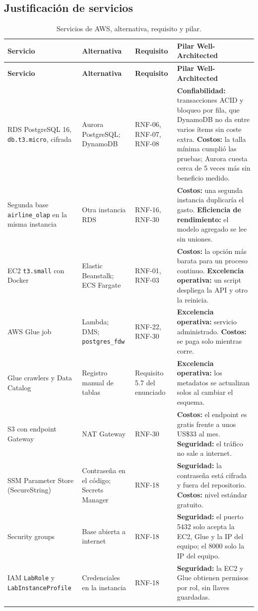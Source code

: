 \subsection{Justificación de servicios}
\begin{longtable}{@{}L{3.0cm} L{2.6cm} L{2.6cm} L{7.4cm}@{}}
\toprule \textbf{Servicio} & \textbf{Alternativa} & \textbf{Requisito} & \textbf{Pilar Well-Architected} \\ \midrule \endfirsthead
\toprule \textbf{Servicio} & \textbf{Alternativa} & \textbf{Requisito} & \textbf{Pilar Well-Architected} \\ \midrule \endhead
RDS PostgreSQL 16, \texttt{db.t3.micro}, cifrada & Aurora PostgreSQL; DynamoDB & RNF-06, RNF-07, RNF-08 & \textbf{Confiabilidad:} transacciones ACID y bloqueo por fila, que DynamoDB no da entre varios ítems sin coste extra. \textbf{Costos:} la talla mínima cumplió las pruebas; Aurora cuesta cerca de 5 veces más sin beneficio medido. \\
Segunda base \texttt{airline\_olap} en la misma instancia & Otra instancia RDS & RNF-16, RNF-30 & \textbf{Costos:} una segunda instancia duplicaría el gasto. \textbf{Eficiencia de rendimiento:} el modelo agregado se lee sin uniones. \\
EC2 \texttt{t3.small} con Docker & Elastic Beanstalk; ECS Fargate & RNF-01, RNF-03 & \textbf{Costos:} la opción más barata para un proceso continuo. \textbf{Excelencia operativa:} un script despliega la API y otro la reinicia. \\
AWS Glue job & Lambda; DMS; \texttt{postgres\_fdw} & RNF-22, RNF-30 & \textbf{Excelencia operativa:} servicio administrado. \textbf{Costos:} se paga solo mientras corre. \\
Glue crawlers y Data Catalog & Registro manual de tablas & Requisito 5.7 del enunciado & \textbf{Excelencia operativa:} los metadatos se actualizan solos al cambiar el esquema. \\
S3 con endpoint Gateway & NAT Gateway & RNF-30 & \textbf{Costos:} el endpoint es gratis frente a unos US\$33 al mes. \textbf{Seguridad:} el tráfico no sale a internet. \\
SSM Parameter Store (SecureString) & Contraseña en el código; Secrets Manager & RNF-18 & \textbf{Seguridad:} la contraseña está cifrada y fuera del repositorio. \textbf{Costos:} nivel estándar gratuito. \\
Security groups & Base abierta a internet & RNF-18 & \textbf{Seguridad:} el puerto 5432 solo acepta la EC2, Glue y la IP del equipo; el 8000 solo la IP del equipo. \\
IAM \texttt{LabRole} y \texttt{LabInstanceProfile} & Credenciales en la instancia & RNF-18 & \textbf{Seguridad:} la EC2 y Glue obtienen permisos por rol, sin llaves guardadas. \\
\bottomrule
\caption{Servicios de AWS, alternativa, requisito y pilar.}
\end{longtable}

